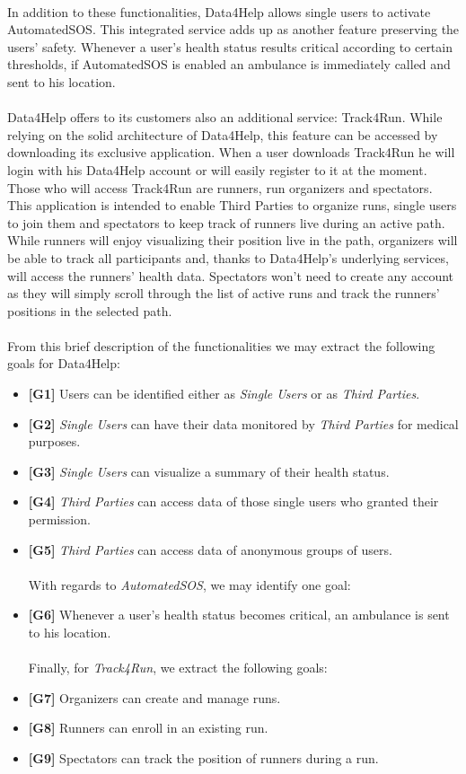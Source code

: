 \documentclass[titlepage]{article}
\begin{document}
\\
In addition to these functionalities, Data4Help allows single users to activate AutomatedSOS. This integrated service adds up as another feature preserving the users’ safety. Whenever a user’s health status results critical according to certain thresholds, if AutomatedSOS is enabled an ambulance is immediately called and sent to his location.\\
\\
Data4Help offers to its customers also an additional service: Track4Run. While relying on the solid architecture of Data4Help, this feature can be accessed by downloading its exclusive application. When a user downloads Track4Run he will login with his Data4Help account or will easily register to it at the moment. Those who will access Track4Run are runners, run organizers and spectators. This application is intended to enable Third Parties to organize runs, single users to join them and spectators to keep track of runners live during an active path. While runners will enjoy visualizing their position live in the path, organizers will be able to track all participants and, thanks to Data4Help’s underlying services, will access the runners’ health data. Spectators won’t need to create any account as they will simply scroll through the list of active runs and track the runners’ positions in the selected path.\\
\\
From this brief description of the functionalities we may extract the following goals for Data4Help: \\
		
		\begin{itemize} %

   			 \item {\bf [G1]} Users can be identified either as {\it Single Users} or as {\it Third Parties}.				
			 \item {\bf [G2]} {\it Single Users} can have their data monitored by {\it Third Parties} for medical purposes.
   			 \item {\bf [G3]} {\it Single Users} can visualize a summary of their health status.
   			 \item {\bf [G4]} {\it Third Parties} can access data of those single users who granted their permission.
   			 \item {\bf [G5]} {\it Third Parties} can access data of anonymous groups of users. \\
			 \\
With regards to {\it AutomatedSOS}, we may identify one goal: 
   			 \item {\bf [G6]} Whenever a user’s health status becomes critical, an ambulance is sent to his location. \\	
			 \\
 Finally, for {\it Track4Run}, we extract the following goals:
			  \item {\bf [G7]} Organizers can create and manage runs.
			  \item {\bf [G8]} Runners can enroll in an existing run.
			  \item {\bf [G9]} Spectators can track the position of runners during a run.
			\end{itemize}
			
\end{document}
